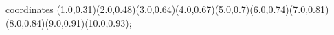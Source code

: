 					coordinates { (1.0,0.31)(2.0,0.48)(3.0,0.64)(4.0,0.67)(5.0,0.7)(6.0,0.74)(7.0,0.81)(8.0,0.84)(9.0,0.91)(10.0,0.93)};